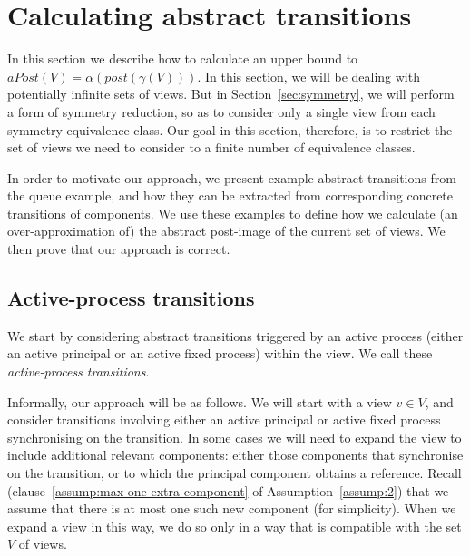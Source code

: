
\section{Calculating abstract transitions}
\label{sec:transitions}

In this section we describe how to calculate an upper bound to $aPost(V) =
\alpha(post(\gamma(V)))$.  In this section, we will be dealing with
potentially infinite sets of views.  But in Section~\ref{sec:symmetry}, we
will perform a form of symmetry reduction, so as to consider only a single
view from each symmetry equivalence class.  Our goal in this section,
therefore, is to restrict the set of views we need to consider to a finite
number of equivalence classes.

In order to motivate our approach, we present example abstract transitions
from the queue example, and how they can be extracted from
corresponding concrete transitions of components.  We use these examples to
define how we calculate (an over-approximation of) the abstract post-image of
the current set of views.  We then prove that our approach is correct.

\subsection{Active-process transitions}

We start by considering abstract transitions triggered by an active process
(either an active principal or an active fixed process) within the view.  We
call these \emph{active-process transitions}.

Informally, our approach will be as follows.  We will start with a view $v \in
V$, and consider transitions involving either an active principal or active
fixed process synchronising on the transition.
In some cases we will need to expand the view to include additional relevant
components: either those components that synchronise on the transition, or to
which the principal component obtains a reference.  Recall
(clause~\ref{assump:max-one-extra-component} of Assumption~\ref{assump:2}) that
we assume that there is at most one such new component (for simplicity).  When
we expand a view in this way, we do so only in a way that is compatible with
the set $V$ of views.

